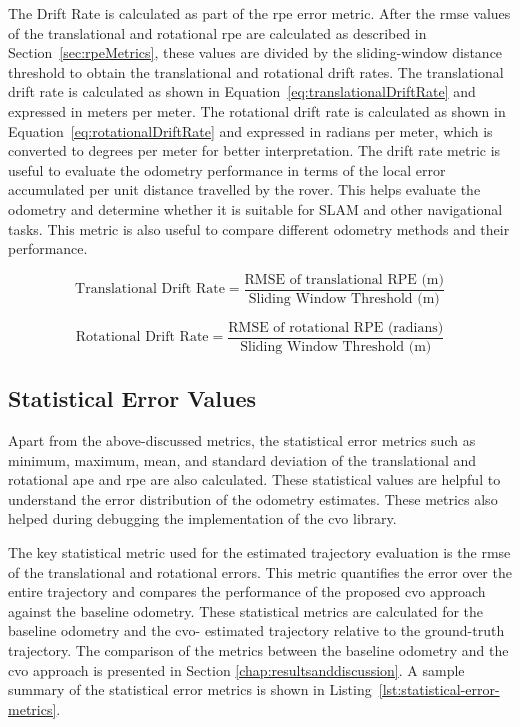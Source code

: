 \documentclass[report.tex]{subfiles}
\begin{document}
    The Drift Rate is calculated as part of the \gls{rpe} error metric. After the \gls{rmse} values of the translational and rotational \gls{rpe} are calculated as described in Section~\ref{sec:rpeMetrics}, these values are divided by the sliding-window distance threshold to obtain the translational and rotational drift rates. The translational drift rate is calculated as shown in Equation~\ref{eq:translationalDriftRate} and expressed in meters per meter. The rotational drift rate is calculated as shown in Equation~\ref{eq:rotationalDriftRate} and expressed in radians per meter, which is converted to degrees per meter for better interpretation. The drift rate metric is useful to evaluate the odometry performance in terms of the local error accumulated per unit distance travelled by the rover. This helps evaluate the odometry and determine whether it is suitable for SLAM and other navigational tasks. This metric is also useful to compare different odometry methods and their performance.
    
    \begin{equation}
        \text{Translational Drift Rate} = \frac{\text{RMSE of translational RPE (m)}}{\text{Sliding Window Threshold (m)}}
        \label{eq:translationalDriftRate}
    \end{equation}
    
    \begin{equation}
        \text{Rotational Drift Rate} = \frac{\text{RMSE of rotational RPE (radians)}}{\text{Sliding Window Threshold (m)}}
        \label{eq:rotationalDriftRate}
    \end{equation}
       
    \subsection{Statistical Error Values}
    
    Apart from the above-discussed metrics, the statistical error metrics such as minimum, maximum, mean, and standard deviation of the translational and rotational \gls{ape} and \gls{rpe} are also calculated. These statistical values are helpful to understand the error distribution of the odometry estimates. These metrics also helped during debugging the implementation of the \gls{cvo} library.  
    
    The key statistical metric used for the estimated trajectory evaluation is the \gls{rmse} of the translational and rotational errors. This metric quantifies the error over the entire trajectory and compares the performance of the proposed \gls{cvo} approach against the baseline odometry. These statistical metrics are calculated for the baseline odometry and the \gls{cvo}- estimated trajectory relative to the ground-truth trajectory. The comparison of the metrics between the baseline odometry and the \gls{cvo} approach is presented in Section \ref{chap:resultsanddiscussion}. A sample summary of the statistical error metrics is shown in Listing~\ref{lst:statistical-error-metrics}. 
    
\end{document}
